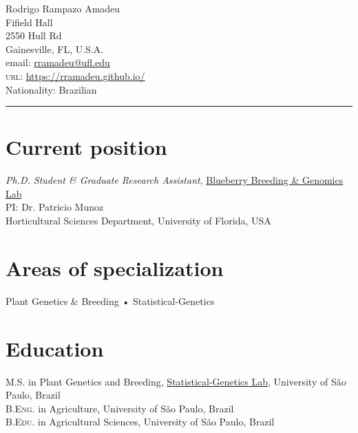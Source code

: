 \documentclass[10pt, a4paper]{article}
\newcommand{\years}[1]{\marginnote{\scriptsize #1}}
\begin{document}
{\LARGE Rodrigo Rampazo Amadeu}\\[1cm]
 Fifield Hall\\
 2550  Hull Rd\\
Gainesville, FL, U.S.A.\\[.2cm]
email: \href{mailto:rramadeu@ufl.edu}{rramadeu@ufl.edu}\\
\textsc{url}: \href{https://rramadeu.github.io/}{https://rramadeu.github.io/}\\ 
Nationality:  Brazilian\\
\hrule
\section*{Current position}
\emph{Ph.D. Student \& Graduate Research Assistant}, \href{https://www.blueberrybreeding.com}{Blueberry Breeding \& Genomics Lab}\\
PI: Dr. Patricio Munoz\\
Horticultural Sciences Department, University of Florida, USA

\section*{Areas of specialization}
 Plant Genetics \& Breeding • Statistical-Genetics


\section*{Education}
\noindent
\years{2018}\textsc{M.S.} in Plant Genetics and Breeding, \href{http://statgen.esalq.usp.br}{Statistical-Genetics Lab}, University of São Paulo, Brazil\\
\years{2016}\textsc{B.Eng.} in Agriculture, University of São Paulo, Brazil\\
\years{2016}\textsc{B.Edu.} in Agricultural Sciences, University of São Paulo, Brazil\\
\end{document}
